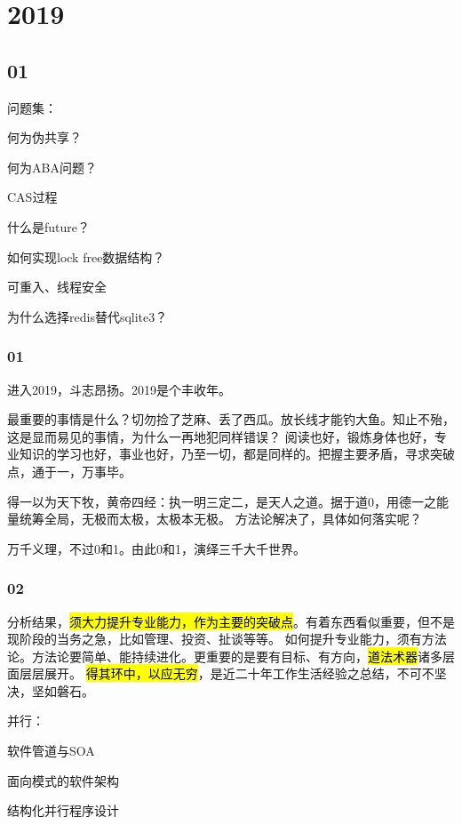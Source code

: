 \chapter{2019}

\section{01}

问题集：
\begin{enumbox}
\item 何为伪共享？
\item 何为ABA问题？
\item CAS过程
\item 什么是future？
\item 如何实现lock free数据结构？
\item 可重入、线程安全
\item 为什么选择redis替代sqlite3？
\end{enumbox}

\subsection{01}

进入2019，斗志昂扬。2019是个丰收年。

最重要的事情是什么？切勿捡了芝麻、丢了西瓜。放长线才能钓大鱼。知止不殆，这是显而易见的事情，为什么一再地犯同样错误？
阅读也好，锻炼身体也好，专业知识的学习也好，事业也好，乃至一切，都是同样的。把握主要矛盾，寻求突破点，通于一，万事毕。

得一以为天下牧，黄帝四经：执一明三定二，是天人之道。据于道0，用德一之能量统筹全局，无极而太极，太极本无极。
方法论解决了，具体如何落实呢？

万千义理，不过0和1。由此0和1，演绎三千大千世界。

\subsection{02}

分析结果，\hl{须大力提升专业能力，作为主要的突破点}。有着东西看似重要，但不是现阶段的当务之急，比如管理、投资、扯谈等等。
如何提升专业能力，须有方法论。方法论要简单、能持续进化。更重要的是要有目标、有方向，\hl{道法术器}诸多层面层层展开。
\hl{得其环中，以应无穷}，是近二十年工作生活经验之总结，不可不坚决，坚如磐石。

并行：
\begin{enumbox}
\item 软件管道与SOA
\item 面向模式的软件架构
\item 结构化并行程序设计
\end{enumbox}

